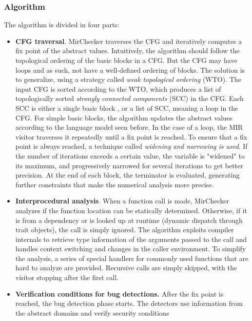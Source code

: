 \documentclass{article}
\begin{document}
\subsubsection{Algorithm}
The algorithm is divided in four parts: \begin{itemize}
    \item \textbf{CFG traversal}. MirChecker traverses the CFG and iteratively computes a fix point of the abstract values. 
    Intuitively, the algorithm should follow the topological ordering of the basic blocks in a CFG. But the CFG may have loops and as such, not have a 
    well-defined ordering of blocks. The solution is to generalize, using a strategy called \textit{weak topological ordering} (WTO). The input CFG 
    is sorted according to the WTO, which produces a list  of topologically sorted \textit{strongly connected components} (SCC) in the CFG. Each SCC is either 
    a single basic block , or a list of SCC, meaning a loop in the CFG. For simple basic blocks, the algorithm updates the abstract values according to the language model 
    seen before. In the case of a loop, the MIR visitor traverses it repeatedly until a fix point is reached. To ensure that a fix point is always reached, 
    a technique called \textit{widening and narrowing is used}.  If the number of iterations exceeds a certain value, the variable 
    is "widened" to its maximum, and progressively narrowed for several iterations  to get better precision. At the end of each block, the terminator is evaluated, 
    generating further constraints that make the numerical analysis more precise.
    \item \textbf{Interprocedural analysis}. When a function call is made, MirChecker analyzes if the function 
    location can be statically determined. Otherwise, if it is from a dependency or 
    is looked up at runtime (dynamic dispatch through trait objects), the call is simply ignored. 
        The algorithm exploits compiler internals to retrieve 
    type information of the arguments passed to the call and handles context switching and changes in the caller environment. To simplify the analysis, a series 
    of special handlers for commonly used functions that are hard to analyze are provided. Recursive calls are simply skipped, 
    with the visitor stopping after the first call.
    \item \textbf{Verification conditions for bug detections.} After the fix point is reached,  
    the bug detection phase starts. The detectors use information from the abstract domains and verify security conditions

\end{itemize}
\end{document}
